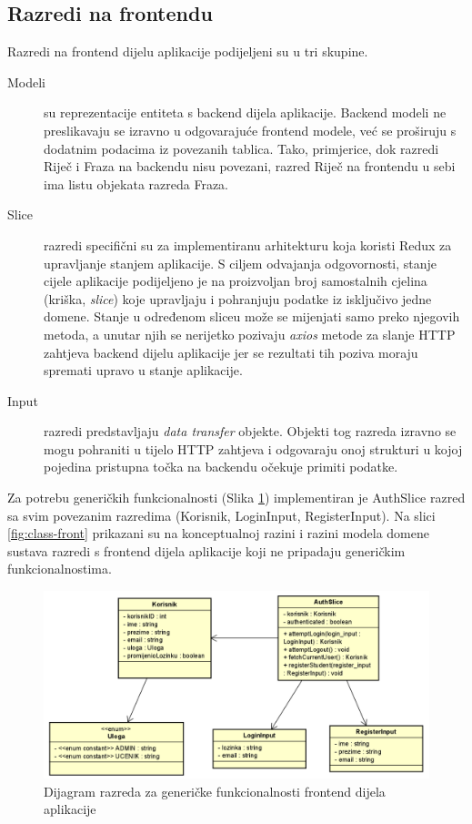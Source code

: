 \subsection{Razredi na frontendu}

Razredi na frontend dijelu aplikacije podijeljeni su u tri skupine.
\begin{description}
	\item[Modeli] su reprezentacije entiteta s backend dijela aplikacije. Backend modeli ne preslikavaju se izravno u odgovarajuće frontend modele, već se proširuju s dodatnim podacima iz povezanih tablica. Tako, primjerice, dok razredi Riječ i Fraza na backendu nisu povezani, razred Riječ na frontendu u sebi ima listu objekata razreda Fraza.
	\item[Slice] razredi specifični su za implementiranu arhitekturu koja koristi Redux za upravljanje stanjem aplikacije. S ciljem odvajanja odgovornosti, stanje cijele aplikacije podijeljeno je na proizvoljan broj samostalnih cjelina (kriška, \textit{slice}) koje upravljaju i pohranjuju podatke iz isključivo jedne domene. Stanje u određenom sliceu može se mijenjati samo preko njegovih metoda, a unutar njih se nerijetko pozivaju \textit{axios} metode za slanje HTTP zahtjeva backend dijelu aplikacije jer se rezultati tih poziva moraju spremati upravo u stanje aplikacije.
	\item[Input] razredi predstavljaju \textit{data transfer} objekte. Objekti tog razreda izravno se mogu pohraniti u tijelo HTTP zahtjeva i odgovaraju onoj strukturi u kojoj  pojedina pristupna točka na backendu očekuje primiti podatke.
\end{description}

Za potrebu generičkih funkcionalnosti (Slika \ref{fig:class-front-implemented}) implementiran je AuthSlice razred sa svim povezanim razredima (Korisnik, LoginInput, RegisterInput). Na slici \ref{fig:class-front} prikazani su na konceptualnoj razini i razini modela domene sustava razredi s frontend dijela aplikacije koji ne pripadaju generičkim funkcionalnostima.

\begin{figure}[htp]
	\includegraphics[scale=0.55]{dijagrami/class_front_implemented.png}
	\centering
	\caption{Dijagram razreda za generičke funkcionalnosti frontend dijela aplikacije}
	\label{fig:class-front-implemented}
\end{figure}

